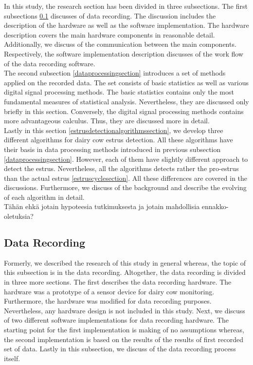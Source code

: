 \documentclass[english,12pt,a4paper,pdftex,elec,utf8]{aaltothesis}
\begin{document}
In this study, the research section has been divided in three subsections. The first subsections \ref{datarecordingsection}  discusses of data recording. The discussion includes the description of the hardware as well as the software implementation. The hardware description covers the main hardware components in reasonable detail. Additionally, we discuss of the communication between the main components. Respectively, the software implementation description discusses of the work flow of the data recording software. \\

The second subsection \ref{dataprocessingsection} introduces a set of methods applied on the recorded data. The set consists of basic statistics as well as various digital signal processing methods. The basic statistics contains only the most fundamental measures of statistical analysis. Nevertheless, they are discussed only briefly in this section. Conversely, the digital signal processing methods contains more advantageous calculus. Thus, they are discussed more in detail. \\

Lastly in this section \ref{estrusdetectionalgorithmssection}, we develop three different algorithms for dairy cow estrus detection. All these algorithms have their basis in data processing methods introduced in previous subsection \ref{dataprocessingsection}. However, each of them have slightly different approach to detect the estrus. Nevertheless, all the algorithms detects rather the pro-estrus than the actual estrus \ref{estruscyclesection}. All these differences are covered in the discussions. Furthermore, we discuss of the background and describe the evolving of each algorithm in detail. \\


Tähän ehkä jotain hypoteesia tutkimuksesta ja jotain mahdollisia ennakko-oletuksia?



\subsection{Data Recording} \label{datarecordingsection}

Formerly, we described the research of this study in general whereas, the topic of this subsection is in the data recording. Altogether, the data recording is divided in three more sections. The first describes the data recording hardware. The hardware was a prototype of a sensor device for dairy cow monitoring. Furthermore, the hardware was modified for data recording purposes. Nevertheless, any hardware design is not included in this study. Next, we discuss of two different software implementations for data recording hardware. The starting point for the first implementation is making of no assumptions whereas, the second implementation is based on the results of the results of first recorded set of data. Lastly in this subsection, we discuss of the data recording process itself.  \\
\end{document}

